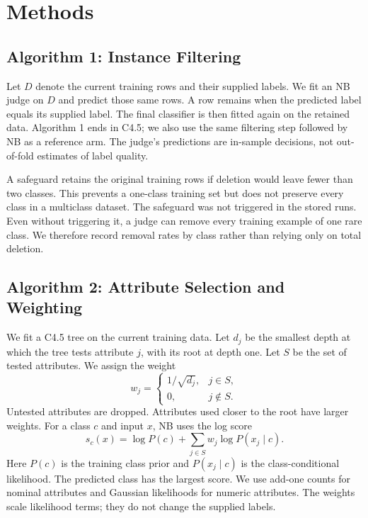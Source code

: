 \documentclass[conference,a4paper]{IEEEtran}
\begin{document}
\section{Methods}
\subsection{Algorithm 1: Instance Filtering}
Let $D$ denote the current training rows and their supplied labels. We fit an NB judge on $D$ and predict those same rows. A row remains when the predicted label equals its supplied label. The final classifier is then fitted again on the retained data. Algorithm 1 ends in C4.5; we also use the same filtering step followed by NB as a reference arm. The judge's predictions are in-sample decisions, not out-of-fold estimates of label quality.

A safeguard retains the original training rows if deletion would leave fewer than two classes. This prevents a one-class training set but does not preserve every class in a multiclass dataset. The safeguard was not triggered in the stored runs. Even without triggering it, a judge can remove every training example of one rare class. We therefore record removal rates by class rather than relying only on total deletion.

\subsection{Algorithm 2: Attribute Selection and Weighting}
We fit a C4.5 tree on the current training data. Let $d_j$ be the smallest depth at which the tree tests attribute $j$, with its root at depth one. Let $S$ be the set of tested attributes. We assign the weight
\begin{equation}
w_j=\begin{cases}1/\sqrt{d_j},&j\in S,\\0,&j\notin S.\end{cases}
\label{eq:weights}
\end{equation}
Untested attributes are dropped. Attributes used closer to the root have larger weights. For a class $c$ and input $x$, NB uses the log score
\begin{equation}
s_c(x)=\log P(c)+\sum_{j\in S}w_j\log P(x_j\mid c).
\label{eq:nb}
\end{equation}
Here $P(c)$ is the training class prior and $P(x_j\mid c)$ is the class-conditional likelihood. The predicted class has the largest score. We use add-one counts for nominal attributes and Gaussian likelihoods for numeric attributes. The weights scale likelihood terms; they do not change the supplied labels.
\end{document}

